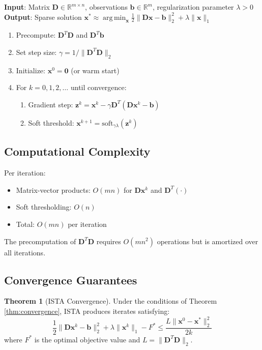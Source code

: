 \documentclass[12pt]{article}
\renewcommand{\vec}[1]{\mathbf{#1}}
\DeclareMathOperator{\argmin}{arg\,min}
\newcommand{\norm}[1]{\lVert #1 \rVert}
\newcommand{\R}{\mathbb{R}}
\theoremstyle{definition}
\newtheorem{theorem}{Theorem}[section]
\begin{document}
\begin{algorithm}
    \textbf{Input}: Matrix $\vec{D} \in \R^{m \times n}$, observations $\vec{b} \in \R^m$, regularization parameter $\lambda > 0$\\
    \textbf{Output}: Sparse solution $\vec{x}^* \approx \argmin_{\vec{x}} \frac{1}{2}\norm{\vec{D}\vec{x} - \vec{b}}_2^2 + \lambda\norm{\vec{x}}_1$

    \begin{enumerate}
        \item Precompute: $\vec{D}^T\vec{D}$ and $\vec{D}^T\vec{b}$
        \item Set step size: $\gamma = 1/\norm{\vec{D}^T\vec{D}}_2$
        \item Initialize: $\vec{x}^0 = \vec{0}$ (or warm start)
        \item For $k = 0, 1, 2, \ldots$ until convergence:
              \begin{enumerate}[label=(\alph*)]
                  \item Gradient step: $\vec{z}^k = \vec{x}^k - \gamma \vec{D}^T(\vec{D}\vec{x}^k - \vec{b})$
                  \item Soft threshold: $\vec{x}^{k+1} = \text{soft}_{\gamma\lambda}(\vec{z}^k)$
              \end{enumerate}
    \end{enumerate}
\end{algorithm}

\subsection{Computational Complexity}

Per iteration:
\begin{itemize}[leftmargin=*]
    \item Matrix-vector products: $O(mn)$ for $\vec{D}\vec{x}^k$ and $\vec{D}^T(\cdot)$
    \item Soft thresholding: $O(n)$
    \item Total: $O(mn)$ per iteration
\end{itemize}

The precomputation of $\vec{D}^T\vec{D}$ requires $O(mn^2)$ operations but is amortized over all iterations.

\subsection{Convergence Guarantees}

\begin{theorem}[ISTA Convergence]
    Under the conditions of Theorem \ref{thm:convergence}, ISTA produces iterates satisfying:
    \begin{equation}
        \frac{1}{2}\norm{\vec{D}\vec{x}^k - \vec{b}}_2^2 + \lambda\norm{\vec{x}^k}_1 - F^* \leq \frac{L\norm{\vec{x}^0 - \vec{x}^*}_2^2}{2k}
    \end{equation}
    where $F^*$ is the optimal objective value and $L = \norm{\vec{D}^T\vec{D}}_2$.
\end{theorem}
\end{document}
